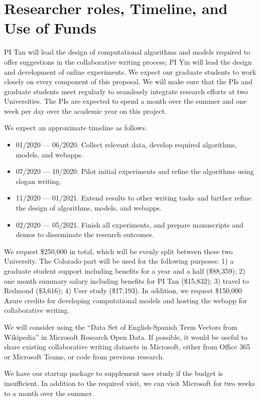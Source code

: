 
\section{Researcher roles, Timeline, and Use of Funds}

PI Tan will lead the design of computational algorithms and models required to offer suggestions in the collaborative writing process;
PI Yin will lead the design and development of online experiments.
We expect our graduate students to work closely on every component of this proposal.
We will make sure that the PIs and graduate students meet regularly to seamlessly integrate research efforts at two Universities.
The PIs are expected to spend a month over the summer and one week per day over the academic year on this project.


 We expect an approximate timeline as follows.

\begin{itemize}[leftmargin=*,noitemsep,topsep=0pt,parsep=0pt,partopsep=0pt]
    \item 01/2020 --- 06/2020. Collect relevant data, develop required algorithms, models, and webapps.
    \item 07/2020 --- 10/2020. Pilot initial experiments and refine the algorithms using slogan writing.
    \item 11/2020 --- 01/2021. Extend results to other writing tasks and further refine the design of algorithms, models, and webapps.
    \item 02/2020 --- 05/2021. Finish all experiments, and prepare manuscripts and demos to disseminate the research outcomes.
\end{itemize}

 We request \$250,000 in total, which will be evenly split between these two University.
The Colorado part will be used for the following purposes:
1) a graduate student support including benefits for a year and a half (\$88,359);
2) one month summary salary including benefits for PI Tan (\$15,832);
3) travel to Redmond (\$3,616);
4) User study (\$17,193).
In addition, we request \$150,000 Azure credits for developing computational models and hosting the webapp for collaborative writing.


 We will consider using the ``Data Set of English-Spanish Term Vectors from Wikipedia'' in Microsoft Research Open Data. 
If possible, it would be useful to share existing collaborative writing datasets in Microsoft, either from Office 365 or Microsoft Teams, or code from previous research.

We have our startup package to supplement user study if the budget is insufficient.
In addition to the required visit, we can visit Microsoft for two weeks to a month over the summer.

